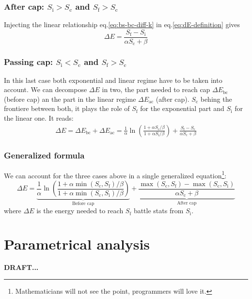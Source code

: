 \documentclass[12pt]{article}
\def\Sc{S_\text{c}}
\def\Si{S_\text{i}}
\def\Sf{S_\text{f}}
\begin{document}
\subsubsection{After cap: $\Si > \Sc$ and $\Sf > \Sc$}
Injecting the linear relationship eq.\eqref{eq:bs-bc-diff-k} in eq.\eqref{eq:dE-definition} gives
\begin{equation}
    \Delta E = \frac{\Sf - \Si}{\alpha \Sc + \beta}
\end{equation}

\subsubsection{Passing cap: $\Si < \Sc$ and $\Sf > \Sc$}
In this last case both exponential and linear regime have to be taken into account.
We can decompose $\Delta E$ in two, the part needed to reach cap $\Delta E_\text{bc}$ (before cap) an the part in the linear regime $\Delta E_\text{ac}$ (after cap). $\Sc$ behing the frontiere between both, it plays the role of $\Sf$ for the exponential part and $\Si$ for the linear one. It reads:
\begin{equation}
    \begin{aligned}
        \Delta E = \Delta E_\text{bc} + \Delta E_\text{ac} = \frac{1}{\alpha} \ln\left( \frac{1 + \alpha\Sc/\beta}{1 + \alpha\Si/\beta} \right) + \frac{\Sf - \Sc}{\alpha \Sc + \beta}
    \end{aligned}
\end{equation}
\subsubsection{Generalized formula}
We can account for the three cases above in a single generalized equation\footnote{Mathematicians will not see the point, programmers will love it.}:
\begin{equation}
    \boxed{\Delta E = \underbrace{\frac{1}{\alpha} \ln\left( \frac{1 + \alpha\min(\Sc, \Sf)/\beta}{1 + \alpha\min(\Sc, \Si)/\beta} \right)}_\text{Before cap} + \underbrace{\frac{\max(\Sc, \Sf) - \max(\Sc, \Si)}{\alpha \Sc + \beta}}_\text{After cap}}
    \label{eq:de-s-general}
\end{equation}
where $\Delta E$ is the energy needed to reach $\Sf$ battle stats from $\Si$.

\section{Parametrical analysis}
\begin{center}
\color{myred}\bf DRAFT...
\end{center}
\end{document}
